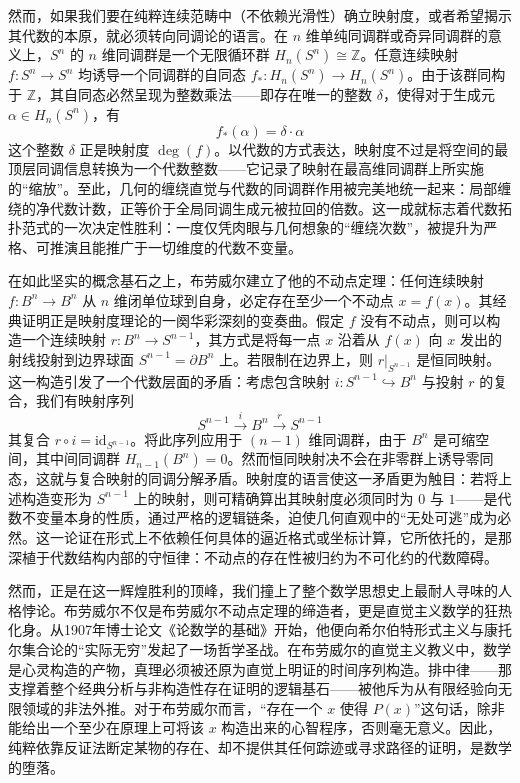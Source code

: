 \documentclass[12pt,a4paper]{article}
\begin{document}
然而，如果我们要在纯粹连续范畴中（不依赖光滑性）确立映射度，或者希望揭示其代数的本原，就必须转向同调论的语言。在 $n$ 维单纯同调群或奇异同调群的意义上，$S^n$ 的 $n$ 维同调群是一个无限循环群 $H_n(S^n) \cong \mathbb{Z}$。任意连续映射 $f: S^n \to S^n$ 均诱导一个同调群的自同态 $f_*: H_n(S^n) \to H_n(S^n)$。由于该群同构于 $\mathbb{Z}$，其自同态必然呈现为整数乘法——即存在唯一的整数 $\delta$，使得对于生成元 $\alpha \in H_n(S^n)$，有
$$
f_*(\alpha) = \delta \cdot \alpha
$$
这个整数 $\delta$ 正是映射度 $\deg(f)$。以代数的方式表达，映射度不过是将空间的最顶层同调信息转换为一个代数整数——它记录了映射在最高维同调群上所实施的“缩放”。至此，几何的缠绕直觉与代数的同调群作用被完美地统一起来：局部缠绕的净代数计数，正等价于全局同调生成元被拉回的倍数。这一成就标志着代数拓扑范式的一次决定性胜利：一度仅凭肉眼与几何想象的“缠绕次数”，被提升为严格、可推演且能推广于一切维度的代数不变量。

在如此坚实的概念基石之上，布劳威尔建立了他的不动点定理：任何连续映射 $f: B^n \to B^n$ 从 $n$ 维闭单位球到自身，必定存在至少一个不动点 $x = f(x)$。其经典证明正是映射度理论的一阕华彩深刻的变奏曲。假定 $f$ 没有不动点，则可以构造一个连续映射 $r: B^n \to S^{n-1}$，其方式是将每一点 $x$ 沿着从 $f(x)$ 向 $x$ 发出的射线投射到边界球面 $S^{n-1} = \partial B^n$ 上。若限制在边界上，则 $r|_{S^{n-1}}$ 是恒同映射。这一构造引发了一个代数层面的矛盾：考虑包含映射 $i: S^{n-1} \hookrightarrow B^n$ 与投射 $r$ 的复合，我们有映射序列
$$
S^{n-1} \xrightarrow{i} B^n \xrightarrow{r} S^{n-1}
$$
其复合 $r \circ i = \text{id}_{S^{n-1}}$。将此序列应用于 $(n-1)$ 维同调群，由于 $B^n$ 是可缩空间，其中间同调群 $H_{n-1}(B^n) = 0$。然而恒同映射决不会在非零群上诱导零同态，这就与复合映射的同调分解矛盾。映射度的语言使这一矛盾更为触目：若将上述构造变形为 $S^{n-1}$ 上的映射，则可精确算出其映射度必须同时为 $0$ 与 $1$——是代数不变量本身的性质，通过严格的逻辑链条，迫使几何直观中的“无处可逃”成为必然。这一论证在形式上不依赖任何具体的逼近格式或坐标计算，它所依托的，是那深植于代数结构内部的守恒律：不动点的存在性被归约为不可化约的代数障碍。

然而，正是在这一辉煌胜利的顶峰，我们撞上了整个数学思想史上最耐人寻味的人格悖论。布劳威尔不仅是布劳威尔不动点定理的缔造者，更是直觉主义数学的狂热化身。从1907年博士论文《论数学的基础》开始，他便向希尔伯特形式主义与康托尔集合论的“实际无穷”发起了一场哲学圣战。在布劳威尔的直觉主义教义中，数学是心灵构造的产物，真理必须被还原为直觉上明证的时间序列构造。排中律——那支撑着整个经典分析与非构造性存在证明的逻辑基石——被他斥为从有限经验向无限领域的非法外推。对于布劳威尔而言，“存在一个 $x$ 使得 $P(x)$”这句话，除非能给出一个至少在原理上可将该 $x$ 构造出来的心智程序，否则毫无意义。因此，纯粹依靠反证法断定某物的存在、却不提供其任何踪迹或寻求路径的证明，是数学的堕落。
\end{document}
